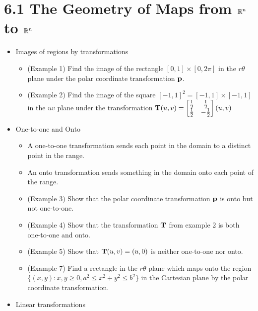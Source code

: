 \documentclass[11pt]{article}
\begin{document}
\section*{6.1 The Geometry of Maps from \(\mathbb R^n\) to \(\mathbb R^n\)}
\begin{itemize}
  \item Images of regions by transformations
    \begin{itemize}
      \item (Example 1) Find the image of the rectangle
            \([0,1]\times[0,2\pi]\) in the \(r\theta\) plane under the
            polar coordinate transformation \(\mathbf{p}\).
      \item (Example 2) Find the image of the square
            \([-1,1]^2=[-1,1]\times[-1,1]\) in the \(uv\) plane under the
            transformation
            \(
              \mathbf{T}(u,v)
                =
              \begin{bmatrix}
                \frac{1}{2} & \frac{1}{2} \\
                \frac{1}{2} & -\frac{1}{2}
              \end{bmatrix}
              \left(u,v\right)
            \)
    \end{itemize}
  \item One-to-one and Onto
    \begin{itemize}
      \item A one-to-one transformation sends each point in the domain to
            a distinct point in the range.
      \item An onto transformation sends something in the domain onto each
            point of the range.
      \item (Example 3) Show that the polar coordinate transformation
            \(\mathbf{p}\) is onto but not one-to-one.
      \item (Example 4) Show that the transformation \(\mathbf{T}\) from example 2
            is both one-to-one and onto.
      \item (Example 5) Show that \(\mathbf{T}(u,v)=(u,0)\) is neither one-to-one
            nor onto.
      \item (Example 7) Find a rectangle in the \(r\theta\) plane which maps
            onto the region \(\{(x,y):x,y\geq 0,a^2\leq x^2+y^2\leq b^2\}\)
            in the Cartesian plane by the polar coordinate transformation.
    \end{itemize}
  \item Linear transformations
    \begin{itemize}

\end{itemize}
\end{itemize}
\end{document}
